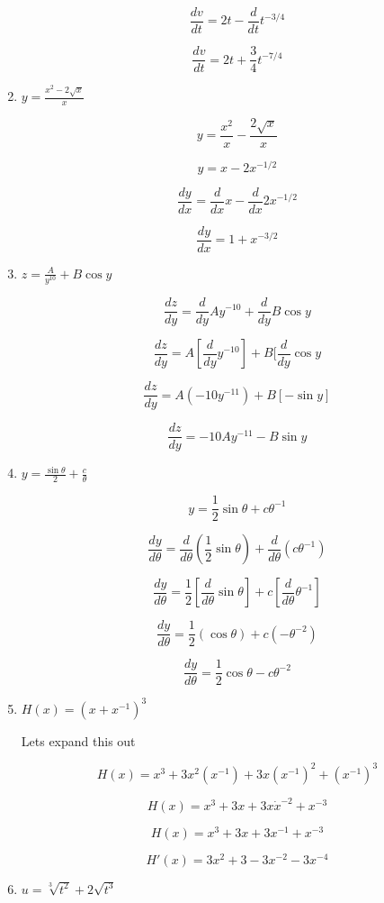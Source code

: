 \documentclass{article}
\begin{document}
\begin{enumerate}
			$$\frac{dv}{dt} = 2t - \frac{d}{dt} t^{-3/4}$$

			$$\frac{dv}{dt} = 2t + \frac{3}{4} t^{-7/4}$$

		\item $y = \frac{x^2 - 2\sqrt{x}}{x}$

			$$y = \frac{x^2}{x} - \frac{2\sqrt{x}}{x}$$

			$$y = x - 2x^{-1/2}$$

			$$\frac{dy}{dx} = \frac{d}{dx} x - \frac{d}{dx} 2x^{-1/2}$$

			$$\frac{dy}{dx} = 1 + x^{-3/2}$$

		\item $z = \frac{A}{y^{10}} + B \cos y$

			$$\frac{dz}{dy} = \frac{d}{dy} Ay^{-10} + \frac{d}{dy} B \cos y$$

			$$\frac{dz}{dy} = A [\frac{d}{dy} y^{-10}] + B [\frac{d}{dy} \cos y$$

			$$\frac{dz}{dy} = A (-10y^{-11}) + B [ - \sin y]$$

			$$\frac{dz}{dy} = -10Ay^{-11} - B\sin y$$

		\item $y = \frac{\sin \theta}{2} + \frac{c}{\theta}$

			$$y = \frac{1}{2} \sin \theta + c \theta^{-1}$$

			$$\frac{dy}{d\theta} = \frac{d}{d\theta} (\frac{1}{2} \sin \theta) + \frac{d}{d\theta} (c \theta^{-1})$$

			$$\frac{dy}{d\theta} = \frac{1}{2} [ \frac{d}{d\theta} \sin \theta ] + c [ \frac{d}{d\theta} \theta^{-1}]$$

			$$\frac{dy}{d\theta} = \frac{1}{2} (\cos \theta) + c (- \theta^{-2})$$

			$$\frac{dy}{d\theta} = \frac{1}{2} \cos \theta - c \theta^{-2}$$

		\item $H(x) = (x + x^{-1})^{3}$

			Lets expand this out

			$$H(x) = x^3 + 3x^2(x^{-1}) + 3x(x^{-1})^{2} + (x^{-1})^{3}$$

			$$H(x) = x^3 + 3x + 3x \dot x^{-2} + x^{-3}$$

			$$H(x) = x^3 + 3x + 3x^{-1} + x^{-3}$$

			$$H'(x) = 3x^2 + 3 - 3x^{-2} - 3x^{-4}$$

		\item $u = \sqrt[3]{t^2} + 2\sqrt{t^3}$


\end{enumerate}
\end{document}
